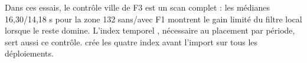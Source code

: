 Dans ces essais, le contrôle ville de F3 est un scan complet : les médianes
16,30/14,18 s pour la zone 132 sans/avec F1 montrent le gain limité du filtre
local lorsque le reste domine. L'index temporel , nécessaire au placement par période, sert aussi ce contrôle.  crée les quatre index avant l'import sur tous les déploiements.
